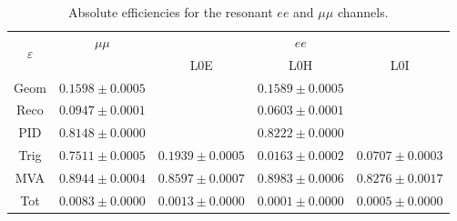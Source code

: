 \begin{table}[h!]
\centering
\caption{Absolute efficiencies for the resonant $ee$ and $\mu\mu$ channels.}
\begin{tabular}{|c|c|c|c|c|}
\hline \multirow{2}{*}{$\varepsilon$} 	&  $\mu\mu$ 	& \multicolumn {3}{c|}{$ee$} \\ \cline{2-5}
	  & &  L0E 	& L0H 	& L0I \\ \hline
Geom  & $ 0.1598  \pm  0.0005 $ & \multicolumn{3}{c|}{$ 0.1589  \pm  0.0005 $} \\
Reco  & $ 0.0947  \pm  0.0001 $ & \multicolumn{3}{c|}{$ 0.0603  \pm  0.0001 $} \\
PID  & $ 0.8148  \pm  0.0000 $ & \multicolumn{3}{c|}{$ 0.8222  \pm  0.0000 $} \\
\hline
Trig  & $ 0.7511  \pm  0.0005 $ & $ 0.1939  \pm  0.0005 $ & $ 0.0163  \pm  0.0002 $ & $ 0.0707  \pm  0.0003 $ \\
MVA  & $ 0.8944  \pm  0.0004 $ & $ 0.8597  \pm  0.0007 $ & $ 0.8983  \pm  0.0006 $ & $ 0.8276  \pm  0.0017 $ \\
\hline
Tot  & $ 0.0083  \pm  0.0000 $ & $ 0.0013  \pm  0.0000 $ & $ 0.0001  \pm  0.0000 $ & $ 0.0005  \pm  0.0000 $ \\
\hline
\end{tabular}
\label{tab:AbsEff_jpsi}
\end{table}

